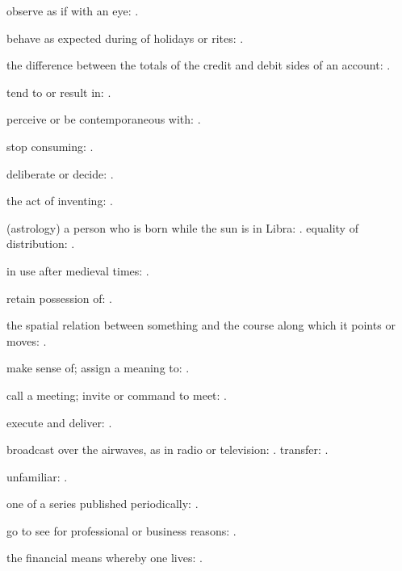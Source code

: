   observe as if with an eye: .

  behave as expected during of holidays or rites:   .

  the difference between the totals of the credit and debit sides of an account: .

  tend to or result in: .

  perceive or be contemporaneous with:   .

  stop consuming:   .

  deliberate or decide: .

  the act of inventing: .

  (astrology) a person who is born while the sun is in Libra:   . equality of distribution:   .

  in use after medieval times: .

  retain possession of:   .

  the spatial relation between something and the course along which it points or moves: .

  make sense of; assign a meaning to:   .

  call a meeting; invite or command to meet: .

  execute and deliver: .

  broadcast over the airwaves, as in radio or television:   . transfer:   .

  unfamiliar: .

  one of a series published periodically:   .

  go to see for professional or business reasons: .

  the financial means whereby one lives:   .


